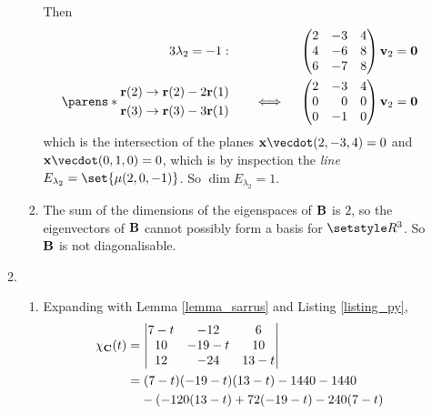 \documentclass[fleqn,a4paper,11pt]{article}
\begin{document}
\begin{enumerate}[label=\textbf{\arabic*.}]
\begin{enumerate}[label=(\textbf{\Alph*})]
\begin{enumerate}[label=(\roman*)]
       Then
       \begin{alignat*}3
        \lambda_2 = -1:\quad
        && &&\begin{pmatrix*}[r]
         2 & -3 & 4 \\
         4 & -6 & 8 \\
         6 & -7 & 8
        \end{pmatrix*}
        \vec v_2 &= \vec 0 \\
        \parens*{
         \begin{aligned}
          \vec r(2) &\to \vec r(2) - 2 \vec r(1) \\
          \vec r(3) &\to \vec r(3) - 3 \vec r(1)
         \end{aligned}
        } \quad
        &&\iff{}&&\begin{pmatrix*}[r]
         2 & -3 & 4 \\
         0 & 0 & 0 \\
         0 & -1 & 0
        \end{pmatrix*}
        \vec v_2 &= \vec 0 \\
       \end{alignat*}
       which is the intersection of the planes
       \(\vec x \vecdot (2, -3, 4) = 0\) and
       \(\vec x \vecdot (0, 1, 0) = 0\), which is by inspection the \emph{line}
       \(E_{\lambda_2} = \set{\mu(2, 0, -1)}\). So
       \(\dim E_{\lambda_2} = 1\).
      \item
       The sum of the dimensions of the eigenspaces of \(\mathbf{B}\) is \(2\), so
       the eigenvectors of \(\mathbf{B}\) cannot possibly form a basis for
       \(\Reals^3\). So \(\mathbf{B}\) is not diagonalisable.
     \end{enumerate}
    \item
     \begin{enumerate}[label=(\roman*)]
      \item
       Expanding with Lemma \ref{lemma_sarrus} and
       Listing \ref{listing_py},
       \begin{align*}
        \chi_{\mat C}(t)
         &= \begin{vmatrix}
          7 - t & -12 & 6 \\
          10 & -19 - t & 10 \\
          12 & -24 & 13 - t
         \end{vmatrix} \\
         &= (7 - t)(-19 - t)(13 - t) - 1440 - 1440 \\
         &\phantom{={}} - (-120(13 - t) + 72(-19 - t) - 240(7 - t) \\

\end{align*}
\end{enumerate}
\end{enumerate}
\end{enumerate}
\end{document}

